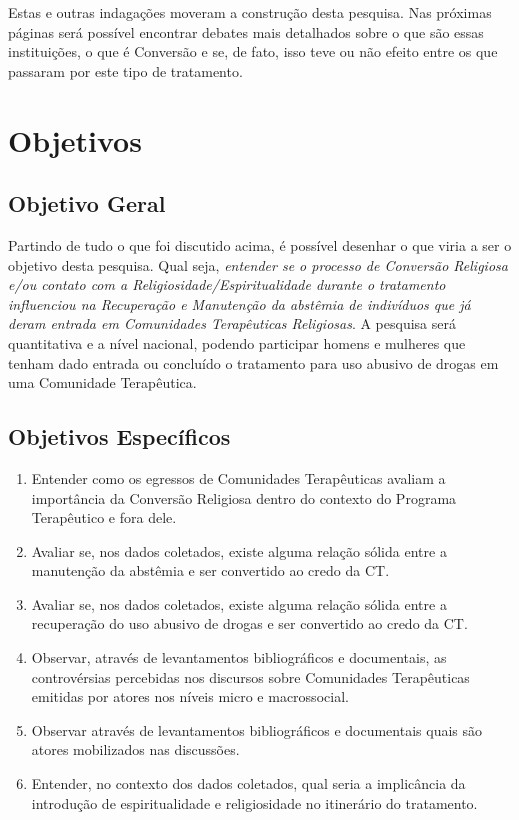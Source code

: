 \documentclass[
	12pt,				%
	oneside,			%
	a4paper,			%
	sumario=tradicional,
	english,			%
	brazil				%
	]{abntex2}
\begin{document}
Estas e outras indagações moveram a construção desta pesquisa. Nas próximas páginas será possível encontrar debates mais detalhados sobre o que são essas instituições, o que é Conversão e se, de fato, isso teve ou não efeito entre os que passaram por este tipo de tratamento.

\hypertarget{objetivos}{%
\chapter{Objetivos}\label{objetivos}}

\hypertarget{objetivo-geral}{%
\section{Objetivo Geral}\label{objetivo-geral}}

Partindo de tudo o que foi discutido acima, é possível desenhar o que viria a ser o objetivo desta pesquisa. Qual seja, \emph{entender se o processo de Conversão Religiosa e/ou contato com a Religiosidade/Espiritualidade durante o tratamento influenciou na Recuperação e Manutenção da abstêmia de indivíduos que já deram entrada em Comunidades Terapêuticas Religiosas}. A pesquisa será quantitativa e a nível nacional, podendo participar homens e mulheres que tenham dado entrada ou concluído o tratamento para uso abusivo de drogas em uma Comunidade Terapêutica.

\hypertarget{objetivos-especuxedficos}{%
\section{Objetivos Específicos}\label{objetivos-especuxedficos}}
\begin{enumerate}
\def\labelenumi{\arabic{enumi}.}
\tightlist
\item
  Entender como os egressos de Comunidades Terapêuticas avaliam a importância da Conversão Religiosa dentro do contexto do Programa Terapêutico e fora dele.
\item
  Avaliar se, nos dados coletados, existe alguma relação sólida entre a manutenção da abstêmia e ser convertido ao credo da CT.
\item
  Avaliar se, nos dados coletados, existe alguma relação sólida entre a recuperação do uso abusivo de drogas e ser convertido ao credo da CT.
\item
  Observar, através de levantamentos bibliográficos e documentais, as controvérsias percebidas nos discursos sobre Comunidades Terapêuticas emitidas por atores nos níveis micro e macrossocial.
\item
  Observar através de levantamentos bibliográficos e documentais quais são atores mobilizados nas discussões.
\item
  Entender, no contexto dos dados coletados, qual seria a implicância da introdução de espiritualidade e religiosidade no itinerário do tratamento.
\end{enumerate}
\newpage
\end{document}
